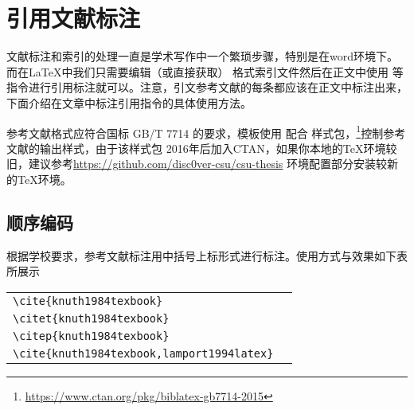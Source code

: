 %
%
%
%
%

\chapter{引用文献标注}

文献标注和索引的处理一直是学术写作中一个繁琐步骤，特别是在word环境下。而在\LaTeX 中我们只需要编辑（或直接获取） \BibLaTeX 格式索引文件然后在正文中使用 等指令进行引用标注就可以。注意，引文参考文献的每条都应该在正文中标注出来\cite{knuth1984texbook,__2011,__2014,__2015,__2016,__2017,_lpr_2019,_lpr_2020,_lpr_2020-1,_lpr_2020-2,_lpr_2021,balakrishnan_corfu_2012,balakrishnan_tango_2013,balakrishnan_virtual_2020,cidon_copysets_2013,csu__2020,ding_scalog_2020,hartman_zebra_1993,jia_boki_2021,kalia_design_2016,knuth1984texbook,lamport1994latex,lockerman_fuzzylog_2018,mehdi_i_2017,Pawlak1982Rough,pritchard1969statistical,wei_vcorfu_2017}，下面介绍在文章中标注引用指令的具体使用方法。

参考文献格式应符合国标 GB/T 7714 的要求，模板使用 \BibLaTeX 配合  样式包，\footnote{\url{https://www.ctan.org/pkg/biblatex-gb7714-2015}}控制参考文献的输出样式，由于该样式包 2016年后加入CTAN，如果你本地的\TeX 环境较旧，建议参考\url{https://github.com/disc0ver-csu/csu-thesis} 环境配置部分安装较新的\TeX 环境。

\section{顺序编码}

根据学校要求，参考文献标注用中括号上标形式进行标注。使用方式与效果如下表所展示

\begin{tabular}{l@{\quad$\Rightarrow$\quad}l}
    \verb|\cite{knuth1984texbook}|               & \cite{knuth1984texbook}               \\
    \verb|\citet{knuth1984texbook}|              & \citet{knuth1984texbook}              \\
    \verb|\citep{knuth1984texbook}|              & \citep{knuth1984texbook}              \\
    \verb|\cite{knuth1984texbook,lamport1994latex}| & \cite{knuth1984texbook,lamport1994latex} \\
\end{tabular}

